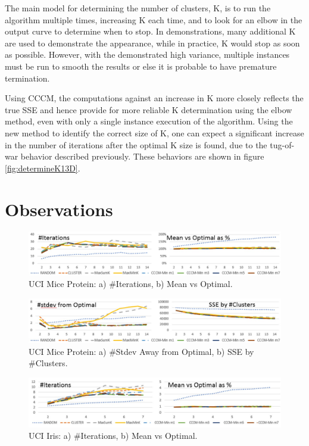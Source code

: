 \documentclass{article}
\begin{document}
The main model for determining the number of clusters, K, is to run the algorithm multiple times, increasing K each time, and to look for an elbow in the output curve to determine when to stop.  In demonstrations, many additional K are used to demonstrate the appearance, while in practice, K would stop as soon as possible.  However, with the demonstrated high variance, multiple instances must be run to smooth the results or else it is probable to have premature termination.

Using CCCM, the computations against an increase in K more closely reflects the true SSE and hence provide for more reliable K determination using the elbow method, even with only a single instance execution of the algorithm.  Using the new method to identify the correct size of K, one can expect a significant increase in the number of iterations after the optimal K size is found, due to the tug-of-war behavior described previously.  These behaviors are shown in figure \ref{fig:determineK13D}.

\section{Observations}

\begin{figure}
  \centering
  \includegraphics[width=\linewidth]{MiceIters.jpg}
  \caption{UCI Mice Protein: a) \#Iterations, b) Mean vs Optimal.}
  \label{fig:miceIters}
\end{figure}

\begin{figure}
  \centering
  \includegraphics[width=\linewidth]{MiceStdev.jpg}
  \caption{UCI Mice Protein: a) \#Stdev Away from Optimal, b) SSE by \#Clusters.}
  \label{fig:miceStdev}
\end{figure}


\begin{figure}
  \centering
  \includegraphics[width=\linewidth]{IrisIters.jpg}
  \caption{UCI Iris: a) \#Iterations, b) Mean vs Optimal.}
  \label{fig:irisIters}
\end{figure}
\end{document}
